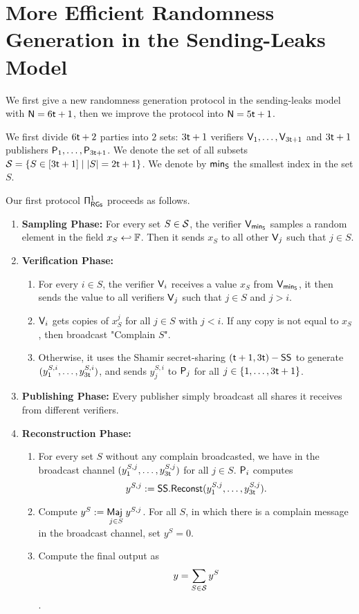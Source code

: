 \section{More Efficient Randomness Generation in the Sending-Leaks Model}

We first give a new randomness generation protocol in the sending-leaks model with $\NumP  = 6 \NumCor+1$, then we improve the protocol into $\NumP = 5 \NumCor+1$.

We first divide $6\NumCor+2$ parties into $2$ sets: $3 \NumCor+1$ verifiers $\Verifier_1, \ldots, \Verifier_{3\NumCor+1}$ and $3 \NumCor+1$ publishers $\Publisher_1, \ldots, \Publisher_{3\NumCor+1}$. We denote the set of all subsets $\Sets = \left\{ S \in [3\NumCor+1]\mid |S| = 2\NumCor+1 \right\}$. We denote by $\minS$ the smallest index in the set $S$.

Our first protocol $\RGSa$ proceeds as follows.

\begin{enumerate}
    \item \textbf{Sampling Phase:} For every set $S\in \Sets$, the verifier $\Verifier_\minS$ samples a random element in the field $x_S \sample \Field$. Then it sends $x_S$ to all other $\Verifier_j$ such that $j \in S$.
    \item \textbf{Verification Phase:}
    \begin{enumerate}
        \item For every $i \in S$, the verifier $\Verifier_i$ receives a value $x_S$ from $\Verifier_\minS$, it then sends the value to all verifiers $\Verifier_j$ such that $j \in S$ and $j>i$.
        \item $\Verifier_i$ gets copies of $x_S^j$ for all $j\in S$ with $j<i$. If any copy is not equal to $x_S$, then broadcast "Complain $S$". 
        \item Otherwise, it uses the Shamir secret-sharing $(\NumCor+1, 3\NumCor)-\SShare$ to generate $(y_1^{S,i}, \ldots, y_{3\NumCor}^{S,i})$, and sends $y_j^{S,i}$ to $\Publisher_j$ for all $j \in \{1, \ldots, 3\NumCor+1\}$.
    \end{enumerate}
    \item \textbf{Publishing Phase:} Every publisher simply broadcast all shares it receives from different verifiers.
    \item \textbf{Reconstruction Phase:}
    \begin{enumerate}
        \item For every set $S$ without any complain broadcasted, we have in the broadcast channel $(y_1^{S,j}, \ldots, y_{3\NumCor}^{S,j})$ for all $j \in S$. $\Publisher_i$ computes 
        $$y^{S,j} \gets \SShare.\Reconst(y_1^{S,j}, \ldots, y_{3\NumCor}^{S,j}).$$
        \item Compute $y^S \gets \Maj[j\in S] y^{S,j}$. For all $S$, in which there is a complain message in the broadcast channel, set $y^S = 0$.
        \item Compute the final output as $$y = \sum_{S \in \Sets} y^S$$.
    \end{enumerate}
\end{enumerate}

